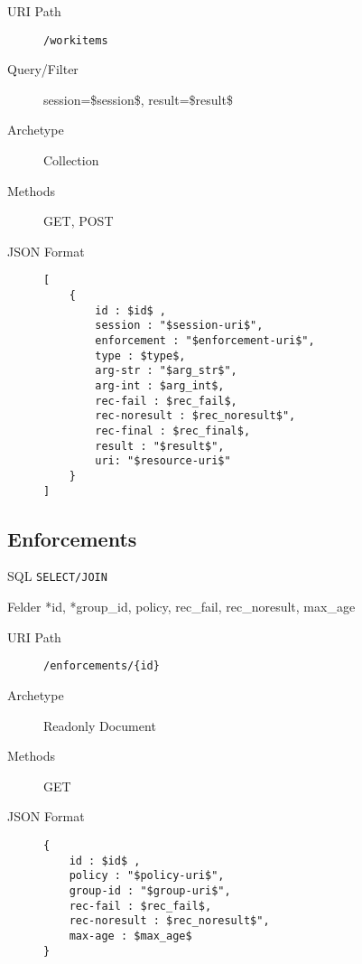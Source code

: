 \documentclass[10pt,a4paper]{scrartcl}
\begin{document}
\begin{mdframed}[style=def]
\begin{description}
	\item[URI Path] \texttt{/workitems}
	\item[Query/Filter]	session=\$session\$, result=\$result\$ 
	\item[Archetype] Collection
	\item[Methods] GET, POST
	\item[JSON Format] \hfill
\begin{lstlisting}
[
	{
	    id : $id$ ,
    	session : "$session-uri$",
    	enforcement : "$enforcement-uri$",
    	type : $type$,
    	arg-str : "$arg_str$",
    	arg-int : $arg_int$,
    	rec-fail : $rec_fail$,
    	rec-noresult : $rec_noresult$", 
    	rec-final : $rec_final$,
    	result : "$result$",
    	uri: "$resource-uri$"
    }
]
\end{lstlisting}
\end{description}
\end{mdframed}


\pagebreak
\subsection{Enforcements}

\begin{description*}
    \item[SQL] \texttt{SELECT/JOIN}
    \item[Felder] *id, *group\_id, policy, rec\_fail, rec\_noresult, max\_age
\end{description*}


\begin{mdframed}[style=def]
\begin{description}
	\item[URI Path] \texttt{/enforcements/\{id\}}
	\item[Archetype] Readonly Document
	\item[Methods] GET
	\item[JSON Format] \hfill
\begin{lstlisting}
{
	id : $id$ ,
	policy : "$policy-uri$",
	group-id : "$group-uri$",
	rec-fail : $rec_fail$,
	rec-noresult : $rec_noresult$", 
	max-age : $max_age$
}
\end{lstlisting}
\end{description}
\end{mdframed}
\end{document}
